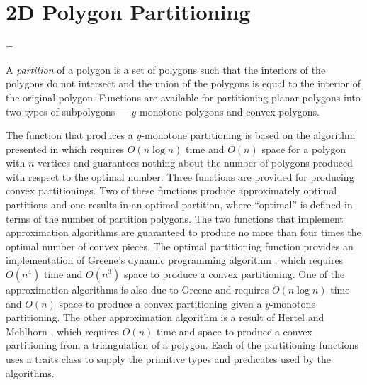 

\chapter{2D Polygon Partitioning}
\label{chap:partition_2_ref}

\begin{ccTexOnly}
\ifnum\ccNewRefManualStyle=\ccTrue
\end{ccTexOnly}
A {\em partition} of a polygon is a set 
of polygons such that the interiors of the polygons do not intersect and 
the union of the polygons is equal to the interior of the original polygon.
Functions are available for partitioning planar polygons into two 
types of subpolygons --- $y$-monotone polygons and convex polygons.  

The function that produces a $y$-monotone partitioning is based on the 
algorithm presented in \cite{bkos-cgaa-97} which requires $O(n \log n)$ time 
and $O(n)$ space for a polygon with $n$ vertices and guarantees nothing 
about the number of polygons produced with respect to the optimal number.
Three functions are provided for producing
convex partitionings. Two of these functions produce approximately optimal 
partitions and one results in an optimal partition, where ``optimal'' is
defined in terms of the number of partition polygons.   The two functions
that implement approximation algorithms are guaranteed to produce no more 
than four times the optimal number of convex pieces.  The optimal partitioning
function provides an implementation of Greene's dynamic programming algorithm
\cite{g-dpcp-83}, which requires $O(n^4)$ time and $O(n^3)$ space to produce a 
convex partitioning. One of the approximation algorithms is also due to 
Greene \cite{g-dpcp-83} and requires $O(n \log n)$ time and $O(n)$ space
to produce a convex partitioning given a $y$-monotone partitioning.  The
other approximation algorithm is a result of Hertel and
Mehlhorn \cite{hm-ftsp-83}, which requires $O(n)$ time and space to produce
a convex partitioning from a triangulation of a polygon.
Each of the partitioning functions uses a traits class to supply the
primitive types and predicates used by the algorithms.
\begin{ccTexOnly}
\fi
\end{ccTexOnly}



